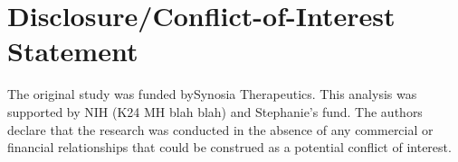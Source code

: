 \section*{Disclosure/Conflict-of-Interest Statement}
The original study was funded bySynosia Therapeutics. This analysis was supported by NIH (K24 MH blah blah) and Stephanie's fund.
The authors declare that the research was conducted in the absence of any commercial or financial relationships that could be construed as a potential conflict of interest.